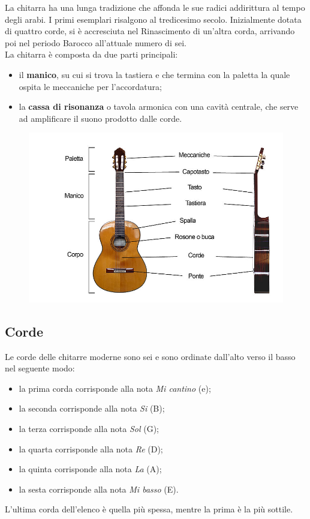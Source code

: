 La chitarra ha una lunga tradizione che affonda le sue radici addirittura al tempo degli arabi. I primi esemplari risalgono al tredicesimo secolo. Inizialmente dotata di quattro corde, si è accresciuta nel Rinascimento di un'altra corda, arrivando poi nel periodo Barocco all'attuale numero di sei.\\
\newline
La chitarra è composta da due parti principali:
\begin{itemize}
	\item il \textbf{manico}, su cui si trova la tastiera e che termina con la paletta la quale ospita le meccaniche per l'accordatura;
	\item la \textbf{cassa di risonanza} o tavola armonica con una cavità centrale, che serve ad amplificare il suono prodotto dalle corde.
\end{itemize}

\begin{figure}[H]
	\centering
	\includegraphics[scale=0.50]{./images/img14.jpg}
\end{figure}

\subsection{Corde}
Le corde delle chitarre moderne sono sei e sono ordinate dall'alto verso il basso nel seguente modo:
\begin{itemize}
	\item la prima corda corrisponde alla nota \textit{Mi cantino} (e);
	\item la seconda corrisponde alla nota \textit{Si} (B);
	\item la terza corrisponde alla nota \textit{Sol} (G);
	\item la quarta corrisponde alla nota \textit{Re} (D);
	\item la quinta corrisponde alla nota \textit{La} (A);
	\item la sesta corrisponde alla nota \textit{Mi basso} (E).
\end{itemize}
L'ultima corda dell'elenco è quella più spessa, mentre la prima è la più sottile.
